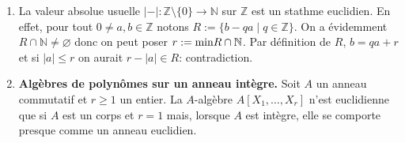 \documentclass[a4paper, oneside, 12pt]{book}
\theoremstyle{theoremeStyle} %
\theoremstyle{definition} %
\newcommand{\Z}{\mathbb{Z}}
\newcommand{\N}{\mathbb{N}}
\begin{document}
    \begin{enumerate}[leftmargin=* ,parsep=0cm,itemsep=0cm,topsep=0cm]
     \item  La valeur absolue usuelle   $|-|:\Z\setminus\lbrace 0\rbrace\rightarrow \N$ sur $\Z$ est un stathme euclidien. En effet, pour tout $0\not= a,b\in \Z$ notons $R:=\lbrace b-qa\;|\; q\in \Z\rbrace $. On a évidemment $R\cap\N\not=\varnothing$  donc on peut poser $r:=\hbox{\rm min} R\cap\N$. Par définition de $R$, $b=qa+r$ et si $|a|\leq  r$ on aurait $r-|a|\in R$: contradiction.  \\

\item \textbf{Algèbres de polynômes sur un anneau intègre.} Soit $A$ un anneau commutatif et $r\geq 1$ un entier. La $A$-algèbre $A[X_1,\dots, X_r]$ n'est  euclidienne  que si $A$ est un corps et $r=1$ mais, lorsque $A$ est intègre, elle se comporte presque comme un anneau euclidien.


\end{enumerate}
\end{document}
